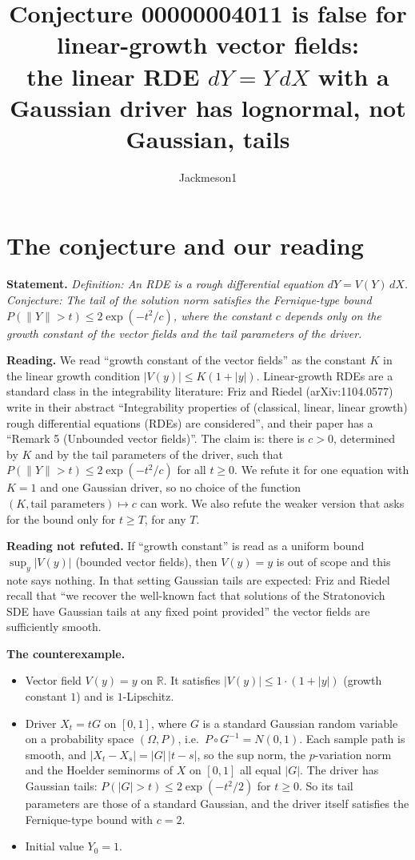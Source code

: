 \documentclass[11pt]{article}
\title{Conjecture 00000004011 is false for linear-growth vector fields:\\
the linear RDE $dY = Y\,dX$ with a Gaussian driver has lognormal, not Gaussian, tails}
\author{Jackmeson1}
\date{}
\theoremstyle{remark}
\begin{document}
\maketitle

\section{The conjecture and our reading}

\textbf{Statement.} \emph{Definition: An RDE is a rough differential equation $dY = V(Y)\,dX$.
Conjecture: The tail of the solution norm satisfies the Fernique-type bound
$P(\|Y\| > t) \le 2\exp(-t^2/c)$, where the constant $c$ depends only on the growth constant of
the vector fields and the tail parameters of the driver.}

\textbf{Reading.} We read ``growth constant of the vector fields'' as the constant $K$ in the
linear growth condition $|V(y)| \le K(1+|y|)$. Linear-growth RDEs are a standard class in the
integrability literature: Friz and Riedel (arXiv:1104.0577) write in their abstract
``Integrability properties of (classical, linear, linear growth) rough differential equations
(RDEs) are considered'', and their paper has a ``Remark 5 (Unbounded vector fields)''.
The claim is: there is $c > 0$, determined by $K$ and by the tail parameters of the driver, such
that $P(\|Y\| > t) \le 2\exp(-t^2/c)$ for all $t \ge 0$. We refute it for one equation with $K = 1$
and one Gaussian driver, so no choice of the function $(K,\text{tail parameters}) \mapsto c$ can
work. We also refute the weaker version that asks for the bound only for $t \ge T$, for any $T$.

\textbf{Reading not refuted.} If ``growth constant'' is read as a uniform bound
$\sup_y |V(y)|$ (bounded vector fields), then $V(y) = y$ is out of scope and this note says
nothing. In that setting Gaussian tails are expected: Friz and Riedel recall that
``we recover the well-known fact that solutions of the Stratonovich SDE have Gaussian tails at any
fixed point provided'' the vector fields are sufficiently smooth.

\textbf{The counterexample.}
\begin{itemize}
\item Vector field $V(y) = y$ on $\mathbb{R}$. It satisfies $|V(y)| \le 1\cdot(1+|y|)$ (growth
constant $1$) and is $1$-Lipschitz.
\item Driver $X_t = tG$ on $[0,1]$, where $G$ is a standard Gaussian random variable on a
probability space $(\Omega, P)$, i.e.\ $P \circ G^{-1} = N(0,1)$. Each sample path is smooth, and
$|X_t - X_s| = |G|\,|t-s|$, so the sup norm, the $p$-variation norm and the Hoelder seminorms of $X$
on $[0,1]$ all equal $|G|$. The driver has Gaussian tails: $P(|G| > t) \le 2\exp(-t^2/2)$ for
$t \ge 0$. So its tail parameters are those of a standard Gaussian, and the driver itself satisfies
the Fernique-type bound with $c = 2$.
\item Initial value $Y_0 = 1$.
\end{itemize}
\end{document}
